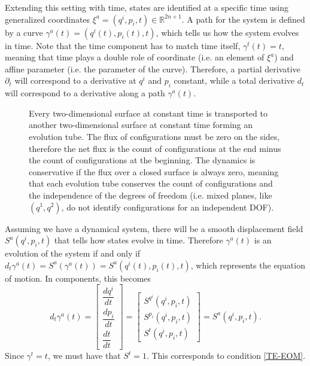 \documentclass[12pt]{article}
\begin{document}
Extending this setting with time, states are identified at a specific time using generalized coordinates $\xi^a = (q^i,p_i,t) \in \mathbb{R}^{2n+1}$. A path for the system is defined by a curve $\gamma^a(t) = (q^i(t), p_i(t), t)$, which tells us how the system evolves in time. Note that the time component has to match time itself, $\gamma^t(t) = t$, meaning that time plays a double role of coordinate (i.e. an element of $\xi^a$) and affine parameter (i.e. the parameter of the curve). Therefore, a partial derivative $\partial_t$ will correspond to a derivative at $q^i$ and $p_i$ constant, while a total derivative $d_t$ will correspond to a derivative along a path $\gamma^a(t)$.

\begin{figure}[h]
    \centering
	
    \caption{Every two-dimensional surface at constant time is transported to another two-dimensional surface at constant time forming an evolution tube. The flux of configurations must be zero on the sides, therefore the net flux is the count of configurations at the end minus the count of configurations at the beginning. The dynamics is conservative if the flux over a closed surface is always zero, meaning that each evolution tube conserves the count of configurations and the independence of the degrees of freedom (i.e. mixed planes, like $(q^1,q^2)$, do not identify configurations for an independent DOF).}\label{evolutionTube}
\end{figure}

Assuming we have a dynamical system, there will be a smooth displacement field $S^a(q^i,p_i,t)$ that tells how states evolve in time. Therefore $\gamma^a(t)$ is an evolution of the system if and only if $d_t \gamma^a(t) = S^a(\gamma^a(t)) = S^a(q^i(t),p_i(t),t)$, which represents the equation of motion. In components, this becomes
\begin{equation}
    d_t \gamma^a(t) = \begin{bmatrix}
\dfrac{dq^i}{dt} \\[1em]
\dfrac{dp_i}{dt} \\[1em]
\dfrac{dt}{dt}
\end{bmatrix} = \begin{bmatrix}
S^{q^i}(q^i,p_i,t) \\[1em]
S^{p_i}(q^i,p_i,t) \\[1em]
S^{t}(q^i,p_i,t) 
\end{bmatrix}= S^a(q^i,p_i,t).
\end{equation}
Since $\gamma^t = t$, we must have that $S^t=1$. This corresponds to condition \ref{TE-EOM}.
\end{document}
